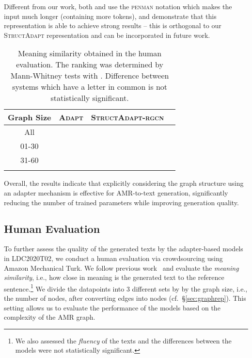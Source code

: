 \documentclass[11pt]{article}
\newcommand{\graphadapter}{{\small\textsc{StructAdapt}}\xspace}
\newcommand{\graphadapterrgcn}{{\small\textsc{StructAdapt-rgcn}}\xspace}
\newcommand{\vanilladapter}{{\small\textsc{Adapt}}\xspace}
\begin{document}
Different from our work, both \citet{mager2020gpttoo} and \citet{ribeiro2020investigating} use the {\small\textsc{penman}} notation which makes the input much longer (containing more tokens), and demonstrate that this representation is able to achieve strong results -- this is orthogonal to our \graphadapter representation and can be incorporated in future work. 

\begin{table}[t]
\small
\centering
{\renewcommand{\arraystretch}{0.9}
\setlength\tabcolsep{2pt}
\setlength{\belowrulesep}{1pt}
\setlength{\aboverulesep}{1pt}
\begin{tabular}{c c c c} 
\toprule
\textbf{Graph Size} & \multicolumn{1}{c}{\vanilladapter} & \multicolumn{1}{c}{\graphadapterrgcn} &  \\
\midrule
 {\small All} &   &  &\\
\midrule
01-30 &  &  &\\
31-60 &  &  &\\
 &  &  &\\
\bottomrule
\end{tabular}}


\caption{Meaning similarity obtained in the human evaluation. The ranking was determined by Mann-Whitney tests with . Difference between systems which have a letter in common is not statistically significant.}
\label{tab:humanevevaluation}
\end{table}

Overall, the results indicate that explicitly considering the graph structure using an adapter mechanism is effective for AMR-to-text generation, significantly reducing the number of trained parameters while improving generation quality. 



\subsection{Human Evaluation}
\label{sec:humanEval}
To further assess the quality of the generated texts by the adapter-based models in LDC2020T02, we conduct a human evaluation via crowdsourcing using Amazon Mechanical Turk.  We follow previous work~\cite{ribeiro-etal-2019-enhancing,castro-ferreira-etal-2019-neural} and evaluate the \emph{meaning similarity}, i.e., how close in meaning is the generated text to the reference sentence.\footnote{We also assessed the \emph{fluency} of the texts and the differences between the models were not statistically significant.} We divide the datapoints into 3 different sets by by the graph size, i.e., the number of nodes, after converting edges into nodes (cf.\ \S\ref{sec:graphrep}). This setting allows us to evaluate the performance of the models based on the complexity of the AMR graph.
\end{document}
